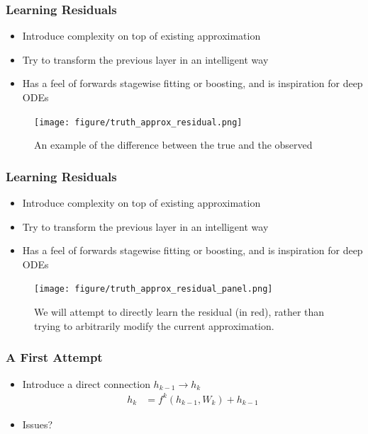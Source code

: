 \documentclass[10pt,mathserif]{beamer}
\begin{document}
\begin{frame}
  \frametitle{Learning Residuals}
  \begin{itemize}
  \item Introduce complexity on top of existing approximation
  \item Try to transform the previous layer in an intelligent way
  \item Has a feel of forwards stagewise fitting or boosting, and is inspiration
    for deep ODEs
  \end{itemize}
\begin{figure}[ht]
  \centering
  \texttt{[image: figure/truth\_approx\_residual.png]}
  \caption{An example of the difference between the true and the
    observed \label{fig:truth_approx} }
\end{figure}
\end{frame}

\begin{frame}
  \frametitle{Learning Residuals}
  \begin{itemize}
  \item Introduce complexity on top of existing approximation
  \item Try to transform the previous layer in an intelligent way
  \item Has a feel of forwards stagewise fitting or boosting, and is inspiration
    for deep ODEs
  \end{itemize}
\begin{figure}[ht]
  \centering
  \texttt{[image: figure/truth\_approx\_residual\_panel.png]}
  \caption{We will attempt to directly learn the residual (in red), rather than
    trying to arbitrarily modify the current approximation.
    \label{fig:truth_approx} }
\end{figure}
\end{frame}

\begin{frame}
  \frametitle{A First Attempt}
  \begin{itemize}
  \item Introduce a direct connection $h_{k - 1} \rightarrow h_k$
    \begin{align*}
      h_{k} &= f^{k}\left(h_{k - 1}, W_{k}\right) + h_{k - 1}
    \end{align*}
  \item Issues?
  \end{itemize}
\end{frame}
\end{document}
